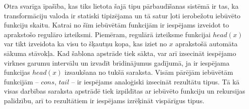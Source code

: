 Otra svarīga īpašība, kas tiks lietota šajā tipu pārbaudīšanas sistēmā ir tas, ka transformāciju valoda ir statiski tipizējama un tā satur ļoti ierobežotu iebūvēto funkciju skaitu. Katrai no šīm iebūvētām funkcijām ir iespējams izveidot to aprakstošo regulāro izteiksmi. Piemēram, regulārā izteiksme funkcijai $head (x)$ var tikt izveidota ka visu to šķautņu kopa, kas iziet no $x$ aprakstošā automāta sākuma stāvokļa. Kad šablona apstrāde tiek sākta, var arī izsecināt iespējamo virknes garumu intervālu un izvadīt brīdinājumus gadījumā, ja ir iespējama funkcijas $head (x)$ izsaukšana no tukšā saraksta. Visām pārējām iebūvētām funkcijām -- $cons$, $tail$ -- ir iespējams analoģiski izsecināt rezultātu tipus. Tā kā visas darbības saraksta apstrādē tiek izpildītas ar iebūvēto funkciju un rekursijas palīdzību, arī to rezultātiem ir iespējams izrēķināt vispārīgus tipus.